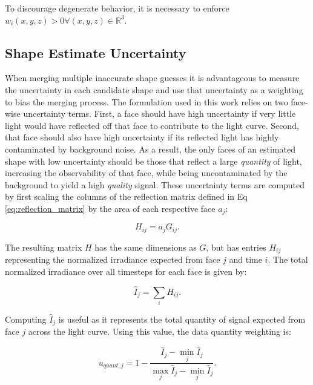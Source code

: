 To discourage degenerate behavior, it is necessary to enforce $w_i(x,y,z) > 0 \forall (x,y,z) \in \mathbb{R}^3$.

\subsection{Shape Estimate Uncertainty}

When merging multiple inaccurate shape guesses it is advantageous to measure the uncertainty in each candidate shape and use that uncertainty as a weighting to bias the merging process. The formulation used in this work relies on two face-wise uncertainty terms. First, a face should have high uncertainty if very little light would have reflected off that face to contribute to the light curve. Second, that face should also have high uncertainty if its reflected light has highly contaminated by background noise. As a result, the only faces of an estimated shape with low uncertainty should be those that reflect a large \textit{quantity} of light, increasing the observability of that face, while being uncontaminated by the background to yield a high \textit{quality} signal. These uncertainty terms are computed by first scaling the columns of the reflection matrix defined in Eq \ref{eq:reflection_matrix} by the area of each respective face $a_j$:

\begin{equation} \label{eq:h_matrix}
  H_{ij} = a_j G_{ij}.
\end{equation}

The resulting matrix $H$ has the same dimensions as $G$, but has entries $H_{ij}$ representing the normalized irradiance expected from face $j$ and time $i$. The total normalized irradiance over all timesteps for each face is given by:

\begin{equation} \label{eq:total_norm_irrad}
  \hat{I}_{j} = \sum_{i}{H_{ij}}.
\end{equation}

Computing $\hat{I}_{j}$ is useful as it represents the total quantity of signal expected from face $j$ across the light curve. Using this value, the data quantity weighting is:

\begin{equation} \label{eq:unc_quantity}
  u_{quant,j} = 1 - \frac{\hat{I}_{j} - \min_{j}{\hat{I}_{j}}}{\max_{j}{\hat{I}_{j}} - \min_{j}{\hat{I}_{j}}}.
\end{equation}

